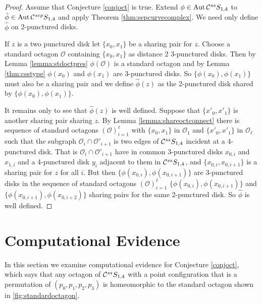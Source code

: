 \begin{proof}
  Assume that Conjecture \ref{conjoct} is true.
  Extend $\phi \in \operatorname{Aut}  \mathcal C^{{ss}}  S_{1,4}$ to $\hat \phi \in \operatorname{Aut}  \mathcal C^{{sep}}  S_{1,4}$
  and apply Theorem \ref{thm:sepcurvecomplex}.
  We need only define $\hat \phi$ on 2-punctured disks.

  If $z$ is a two punctured disk let $\{x_0,x_1\}$ be a sharing pair for $z$.
  Choose a standard octagon $\mathcal O$ containing $\{x_0,x_1\}$ as distance 2 3-punctured disks.
  Then by Lemma \ref{lemma:stdoctpres} $\phi(\mathcal O)$ is a standard octagon
  and by Lemma \ref{thm:csstype} $\phi(x_0)$ and $\phi(x_1)$ are 3-punctured disks.
  So $\{\phi(x_0),\phi(x_1)\}$ must also be a sharing pair and we define
  $\hat \phi (z)$ as the 2-punctured disk shared by $\{\phi(x_0),\phi(x_1)\}$.

  It remains only to see that $\hat \phi (z)$ is well defined.
  Suppose that $\{x'_0,x'_1\}$ is another sharing pair sharing $z$.
  By Lemma
  \ref{lemma:shareoctconnect}
  there is sequence of standard octagons $(\mathcal O)_{i =1}^\ell$ with $\{x_0,x_1\}$
  in $\mathcal O_1$ and $\{x'_0,x'_1\}$ in $\mathcal O_\ell$
  such that the subgraph $\mathcal O_i \cap \mathcal O'_{i+1}$ is two edges of $ \mathcal C^{{ss}}  S_{1,4}$
  incident at a 4-punctured disk. That is $\mathcal O_i \cap \mathcal O'_{i+1}$
  have in common 3-punctured disks  $x_{0,i}$ and $x_{1,i}$
  and a 4-punctured disk $y_{i}$ adjacent to them in $ \mathcal C^{{ss}}  S_{1,4}$,
  and $\{x_{0,i},x_{0,i+1}\}$
  is a sharing pair for $z$ for all $i$.
  But then $\{\phi(x_{0,i}),\phi(x_{0,i+1})\}$ are 3-punctured disks in the sequence of
  standard octagons $(\mathcal O)_{i =1}^\ell$
   $\{\phi(x_{0,i}),\phi(x_{0,i+1})\}$  and  $\{\phi(x_{0,i+1}),\phi(x_{0,i+2})\}$
  sharing pairs for the same 2-punctured disk.
  So $\hat \phi$ is well defined.
\end{proof}

\section{Computational Evidence}
\label{sect:compute}

In this section we examine computational evidence for Conjecture
\ref{conjoct}, which says that any octagon of $ \mathcal C^{{ss}}  S_{1,4}$
with a point configuration that is a permutation of
$(p_0,p_1,p_2,p_3)$ is homeomorphic to the standard octagon shown in
\ref{fig:standardoctagon}.

